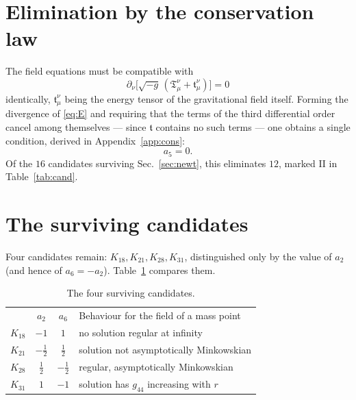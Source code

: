 \documentclass[aps,prd,reprint,amsmath,amssymb,nofootinbib,longbibliography]{revtex4-2}
\begin{document}
\section{Elimination by the conservation law}
\label{sec:cons}

The field equations must be compatible with
\begin{equation}
\partial_\nu \big[ \sqrt{-g}\,( \mathfrak{T}^{\nu}_{\mu} + \mathfrak{t}^{\nu}_{\mu} ) \big] = 0
\label{eq:cons}
\end{equation}
identically, $\mathfrak{t}^{\nu}_{\mu}$ being the energy tensor of the gravitational field itself.
Forming the divergence of \eqref{eq:E} and requiring that the terms of the third differential order
cancel among themselves --- since $\mathfrak{t}$ contains no such terms --- one obtains a single
condition, derived in Appendix~\ref{app:cons}:
\begin{equation}
a_5 = 0 .
\label{eq:cons2}
\end{equation}
Of the $16$ candidates surviving Sec.~\ref{sec:newt}, this eliminates $12$, marked II in
Table~\ref{tab:cand}.

\section{The surviving candidates}
\label{sec:surv}

Four candidates remain: $K_{18}, K_{21}, K_{28}, K_{31}$, distinguished only by the value of $a_2$
(and hence of $a_6 = -a_2$). Table~\ref{tab:surv} compares them.

\begin{table}[t]
\caption{The four surviving candidates.}
\label{tab:surv}
\begin{ruledtabular}
\begin{tabular}{lccl}
 & $a_2$ & $a_6$ & Behaviour for the field of a mass point \\
\colrule
$K_{18}$ & $-1$           & $1$            & no solution regular at infinity \\
$K_{21}$ & $-\frac{1}{2}$ & $\frac{1}{2}$  & solution not asymptotically Minkowskian \\
$K_{28}$ & $\frac{1}{2}$  & $-\frac{1}{2}$ & regular, asymptotically Minkowskian \\
$K_{31}$ & $1$            & $-1$           & solution has $g_{44}$ increasing with $r$ \\
\end{tabular}
\end{ruledtabular}
\end{table}
\end{document}
